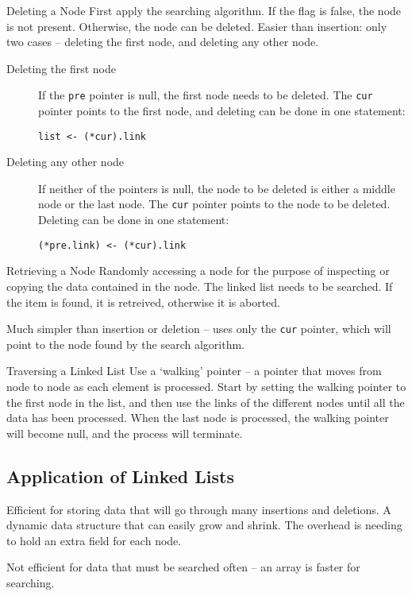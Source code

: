 \documentclass[\main/notes.tex]{subfiles}
\begin{document}
				\begin{definition}{Deleting a Node}
					First apply the searching algorithm. If the flag is false, the node is not present. Otherwise, the node can be deleted. Easier than insertion: only two cases -- deleting the first node, and deleting any other node.
					\begin{indentparagraph}
						\begin{description}
							\item[Deleting the first node] If the \texttt{pre} pointer is null, the first node needs to be deleted. The \texttt{cur} pointer points to the first node, and deleting can be done in one statement:
								\begin{lstlisting}
list <- (*cur).link
								\end{lstlisting}
							\item[Deleting any other node] If neither of the pointers is null, the node to be deleted is either a middle node or the last node. The \texttt{cur} pointer points to the node to be deleted. Deleting can be done in one statement:
								\begin{lstlisting}
(*pre.link) <- (*cur).link
								\end{lstlisting}
						\end{description}
					\end{indentparagraph}
				\end{definition}
				\begin{definition}{Retrieving a Node}
					Randomly accessing a node for the purpose of inspecting or copying the data contained in the node. The linked list needs to be searched. If the item is found, it is retreived, otherwise it is aborted.

					Much simpler than insertion or deletion -- uses only the \texttt{cur} pointer, which will point to the node found by the search algorithm.
				\end{definition}
				\begin{definition}{Traversing a Linked List}
					Use a `walking' pointer -- a pointer that moves from node to node as each element is processed. Start by setting the walking pointer to the first node in the list, and then use the links of the different nodes until all the data has been processed. When the last node is processed, the walking pointer will become null, and the process will terminate.
				\end{definition}
			\subsection{Application of Linked Lists}
				Efficient for storing data that will go through many insertions and deletions. A dynamic data structure that can easily grow and shrink. The overhead is needing to hold an extra field for each node.

				Not efficient for data that must be searched often -- an array is faster for searching.

\end{document}
